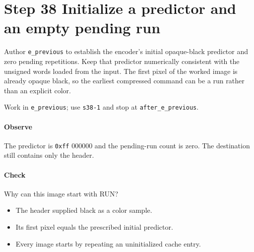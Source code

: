 \section{Step 38 Initialize a predictor and an empty pending run}\label{qoi-s38}
Author \texttt{e\_previous} to establish the encoder’s initial opaque-black predictor and zero pending repetitions. Keep that predictor numerically consistent with the unsigned words loaded from the input. The first pixel of the worked image is already opaque black, so the earliest compressed command can be a run rather than an explicit color.

Work in \texttt{e\_previous}; use \texttt{s38-1} and stop at \texttt{after\_e\_previous}.

\paragraph{Observe} The predictor is \texttt{0xff} 000000 and the pending-run count is zero. The destination still contains only the header.

\paragraph{Check} Why can this image start with RUN?
\begin{itemize}
  \item[A.] The header supplied black as a color sample.
  \item[B.] Its first pixel equals the prescribed initial predictor.
  \item[C.] Every image starts by repeating an uninitialized cache entry.
\end{itemize}
